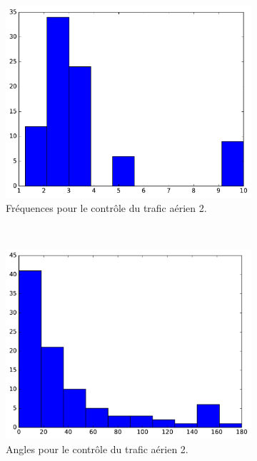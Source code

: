 \begin{figure}
\begin{subfigure}[t]{\subImgWaStats}
			\includegraphics[width=\textwidth]{figures/ch3/germanwingsA_frequency}
			\caption{Fréquences pour le contrôle du trafic aérien 2.}
			\label{fig:germanwingsA_frequency}
		\end{subfigure}
		~
		\begin{subfigure}[t]{\subImgWaStats}
			\centering
			\includegraphics[width=\textwidth]{figures/ch3/germanwingsA_angle}
			\caption{Angles pour le contrôle du trafic aérien 2.}
			\label{fig:germanwingsA_angle}
		\end{subfigure}
		\caption[Histogrammes, contrôle du trafic aérien]{}
		\label{fig:histAirControl}
	\end{figure}
	

